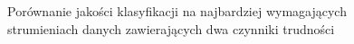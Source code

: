 \begin{figure}[h]
    \centering
    \qquad
    \caption{Porównanie jakości klasyfikacji na najbardziej wymagających strumieniach danych zawierających dwa czynniki trudności}\label{Figure:PairsComparisonHNOB}
\end{figure}

